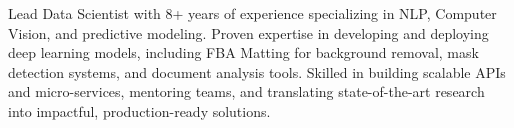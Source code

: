 

\begin{cvparagraph}

Lead Data Scientist with 8+ years of experience specializing in NLP, Computer Vision, and predictive modeling. Proven expertise in developing and deploying deep learning models, including FBA Matting for background removal, mask detection systems, and document analysis tools. Skilled in building scalable APIs and micro-services, mentoring teams, and translating state-of-the-art research into impactful, production-ready solutions.
\end{cvparagraph}

